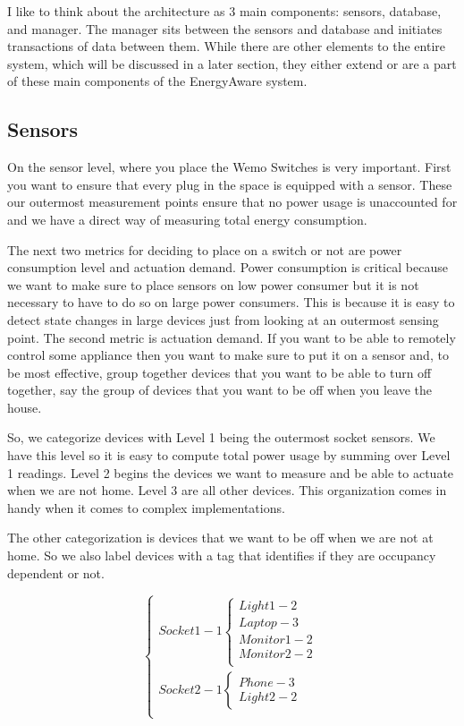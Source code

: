 \documentclass{sig-alternate-05-2015}
\begin{document}
I like to think about the architecture as 3 main components: sensors, database, and manager. The manager sits between the sensors and database and initiates transactions of data between them. While there are other elements to the entire system, which will be discussed in a later section, they either extend or are a part of these main components of the EnergyAware system.

\subsection{Sensors}
On the sensor level, where you place the Wemo Switches is very important. First you want to ensure that every plug in the space is equipped with a sensor. These our outermost measurement points ensure that no power usage is unaccounted for and we have a direct way of measuring total energy consumption.

The next two metrics for deciding to place on a switch or not are power consumption level and actuation demand. Power consumption is critical because we want to make sure to place sensors on low power consumer but it is not necessary to have to do so on large power consumers. This is because it is easy to detect state changes in large devices just from looking at an outermost sensing point.  The second metric is actuation demand. If you want to be able to remotely control some appliance then you want to make sure to put it on a sensor and, to be most effective, group together devices that you want to be able to turn off together, say the group of devices that you want to be off when you leave the house.

So, we categorize devices with Level 1 being the outermost socket sensors. We have this level so it is easy to compute total power usage by summing over Level 1 readings. Level 2 begins the devices we want to measure and be able to actuate when we are not home. Level 3 are all other devices. This organization comes in handy when it comes to complex implementations.

The other categorization is devices that we want to be off when we are  not at home. So we also label devices with a tag that identifies if they are occupancy dependent or not.

\[
\begin{cases}
Socket 1 - 1
\begin{cases}
Light1 - 2\\
Laptop - 3\\
Monitor1 - 2\\
Monitor2 - 2\\
\end{cases}\\
Socket 2 - 1
\begin{cases}
Phone-3\\
Light2-2
\end{cases}\\
\end{cases}
\]
\end{document}

